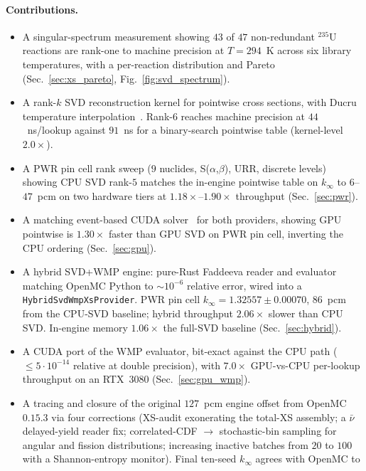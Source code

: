 \documentclass[11pt,a4paper]{article}
\begin{document}
\paragraph{Contributions.}
\begin{itemize}
\item A singular-spectrum measurement showing $43$ of $47$
  non-redundant $^{235}$U reactions are rank-one to machine
  precision at $T = 294$~K across six library temperatures,
  with a per-reaction distribution and Pareto
  (Sec.~\ref{sec:xs_pareto}, Fig.~\ref{fig:svd_spectrum}).
\item A rank-$k$ SVD reconstruction kernel for pointwise
  cross sections, with Ducru temperature
  interpolation~\cite{ducru2017}. Rank-$6$ reaches machine
  precision at $44$~ns/lookup against $91$~ns for a
  binary-search pointwise table (kernel-level $2.0\times$).
\item A PWR pin cell rank sweep ($9$ nuclides,
  S($\alpha$,$\beta$), URR, discrete levels) showing CPU SVD
  rank-$5$ matches the in-engine pointwise table on
  $k_\infty$ to $6$--$47$~pcm on two hardware tiers at
  $1.18\times$--$1.90\times$ throughput
  (Sec.~\ref{sec:pwr}).
\item A matching event-based CUDA solver~\cite{tramm2024} for
  both providers, showing GPU pointwise is $1.30\times$
  faster than GPU SVD on PWR pin cell, inverting the CPU
  ordering (Sec.~\ref{sec:gpu}).
\item A hybrid SVD+WMP engine: pure-Rust Faddeeva reader and
  evaluator matching OpenMC Python to $\sim\!10^{-6}$
  relative error, wired into a
  \texttt{HybridSvdWmpXsProvider}. PWR pin cell $k_\infty =
  1.32557 \pm 0.00070$, $86$~pcm from the CPU-SVD baseline;
  hybrid throughput $2.06\times$ slower than CPU SVD.
  In-engine memory $1.06\times$ the full-SVD baseline
  (Sec.~\ref{sec:hybrid}).
\item A CUDA port of the WMP evaluator, bit-exact against the
  CPU path ($\leq 5 \cdot 10^{-14}$ relative at double
  precision), with $7.0\times$ GPU-vs-CPU per-lookup
  throughput on an RTX~$3080$
  (Sec.~\ref{sec:gpu_wmp}).
\item A tracing and closure of the original $127$~pcm engine
  offset from OpenMC~$0.15.3$ via four corrections (XS-audit
  exonerating the total-XS assembly; a $\bar\nu$ delayed-yield
  reader fix; correlated-CDF $\rightarrow$ stochastic-bin
  sampling for angular and fission distributions; increasing
  inactive batches from $20$ to $100$ with a Shannon-entropy
  monitor). Final ten-seed $k_\infty$ agrees with OpenMC to

\end{itemize}
\end{document}
